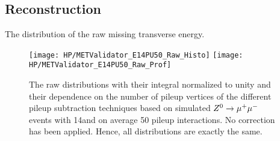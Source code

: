 \subsection{\texorpdfstring{\MET{}}{MET} Reconstruction  \label{sec:HPUAppE14PU50MC}}

The distribution of the raw missing transverse energy. 

\begin{figure}[h!t]
  \centering
  \texttt{[image: HP/METValidator\_E14PU50\_Raw\_Histo]}
  \texttt{[image: HP/METValidator\_E14PU50\_Raw\_Prof]}
  \caption[The raw \MET{} distributions and their dependence on the number of pileup vertices of different pileup subtraction techniques based on simulated  $\Zz\rightarrow\MM$ events with 14\TeV and $\left<PU\right>=50$]{The raw \MET{} distributions with their integral normalized to unity and their dependence on the number of pileup vertices of the different pileup subtraction techniques based on simulated  $\Zz\rightarrow\MM$ events with 14\TeV and on average 50 pileup interactions. No correction has been applied. Hence, all distributions are exactly the same.}
\end{figure}


